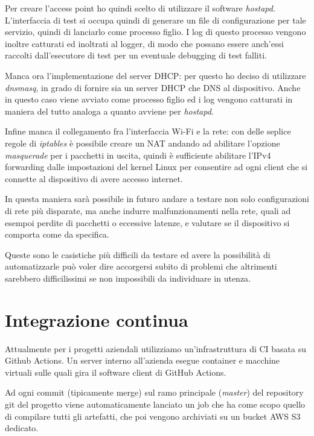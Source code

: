 \documentclass[12pt,a4paper,twoside,titlepage]{book}
\begin{document}
Per creare l'access point ho quindi scelto di utilizzare il software \textit{hostapd}.
L'interfaccia di test si occupa quindi di generare un file di configurazione per tale
servizio, quindi di lanciarlo come processo figlio. I log di questo processo vengono
inoltre catturati ed inoltrati al logger, di modo che possano essere anch'essi raccolti
dall'esecutore di test per un eventuale debugging di test falliti.

Manca ora l'implementazione del server DHCP: per questo ho deciso di utilizzare
\textit{dnsmasq}, in grado di fornire sia un server DHCP che DNS al dispositivo.
Anche in questo caso viene avviato come processo figlio ed i log vengono catturati
in maniera del tutto analoga a quanto avviene per \textit{hostapd}.

Infine manca il collegamento fra l'interfaccia Wi-Fi e la rete: con delle seplice
regole di \textit{iptables} è possibile creare un NAT andando ad abilitare l'opzione
\textit{masquerade} per i pacchetti in uscita, quindi è sufficiente abilitare l'IPv4
forwarding dalle impostazioni del kernel Linux per consentire ad ogni client che si
connette al dispositivo di avere accesso internet.

In questa maniera sarà possibile in futuro andare a testare non solo configurazioni
di rete più disparate, ma anche indurre malfunzionamenti nella rete, quali  ad esempoi
perdite di pacchetti o eccessive latenze, e valutare se il dispositivo si comporta come
da specifica.

Queste sono le casistiche più difficili da testare ed avere la possibilità di automatizzarle
può voler dire accorgersi subito di problemi che altrimenti sarebbero difficilissimi
se non impossibili da individuare in utenza.


\section{Integrazione continua}

Attualmente per i progetti aziendali utilizziamo un'infrastruttura di CI basata
su Github Actions. Un server interno all'azienda esegue container e macchine virtuali
sulle quali gira il software client di GitHub Actions.

Ad ogni commit (tipicamente merge) sul ramo principale (\textit{master}) del repository
git del progetto viene automaticamente lanciato un job che ha come scopo quello
di compilare tutti gli artefatti, che poi vengono archiviati su un bucket AWS S3
dedicato.
\end{document}

